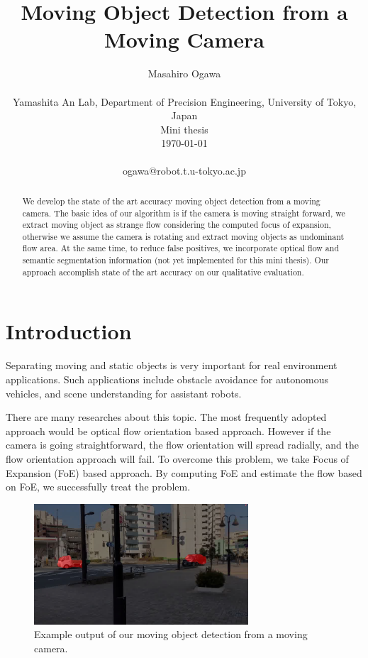 \documentclass[10pt, twocolumn]{article}
\begin{document}
\title{Moving Object Detection from a Moving Camera}

\author{Masahiro Ogawa\\
  \\
  Yamashita An Lab,
  Department of Precision Engineering,
  University of Tokyo, Japan\\
  Mini thesis\\
  \today
  \\
  \\
  ogawa@robot.t.u-tokyo.ac.jp}

\maketitle
\thispagestyle{empty}

\begin{abstract}
 We develop the state of the art accuracy moving object detection from a moving camera.
 The basic idea of our algorithm is if the camera is moving straight forward, we extract moving object as strange flow considering the computed focus of expansion, otherwise we assume the camera is rotating and extract moving objects as undominant flow area. At the same time, to reduce false positives, we incorporate optical flow and semantic segmentation information (not yet implemented for this mini thesis).
 Our approach accomplish state of the art accuracy on our qualitative evaluation.
\end{abstract}



\section{Introduction}
Separating moving and static objects is very important for real environment applications.
Such applications include obstacle avoidance for autonomous vehicles, and scene understanding for assistant robots.

There are many researches about this topic.
The most frequently adopted approach would be optical flow orientation based approach.
However if the camera is going straightforward, the flow orientation will spread radially, and the flow orientation approach will fail.
To overcome this problem, we take Focus of Expansion (FoE) based approach.
By computing FoE and estimate the flow based on FoE, we successfully treat the problem.

\begin{figure}[t]
  \centering
  \includegraphics[width=8cm]{fig/exampleoutput.jpg}
  \caption{Example output of our moving object detection from a moving camera.}
  \label{fig:exampleoutput}
\end{figure}
\end{document}
